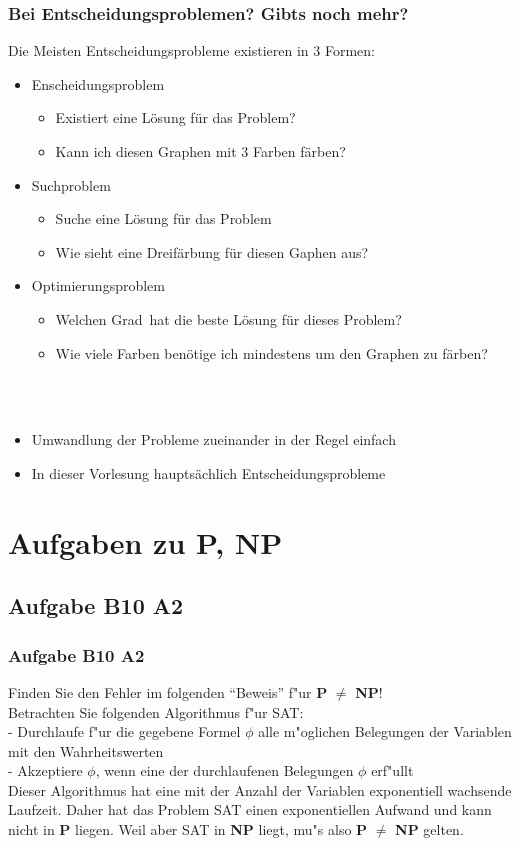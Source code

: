 \begin{frame}
\frametitle{Bei Entscheidungsproblemen? Gibts noch mehr?}

Die Meisten Entscheidungsprobleme existieren in 3 Formen:
\begin{itemize}
	\item Enscheidungsproblem
	\begin{itemize}
		\item Existiert eine Lösung für das Problem?
		\item \glqq Kann ich diesen Graphen mit 3 Farben färben?\grqq
	\end{itemize}
	\item Suchproblem
	\begin{itemize}
		\item Suche eine Lösung für das Problem
		\item \glqq Wie sieht eine Dreifärbung für diesen Gaphen aus?\grqq
	\end{itemize}
	\item Optimierungsproblem
	\begin{itemize}
		\item Welchen \glqq Grad\grqq\ hat die beste Lösung für dieses Problem?
		\item \glqq Wie viele Farben benötige ich mindestens um den Graphen zu färben?\grqq
	\end{itemize}
\end{itemize}~\\~\\
\begin{itemize}
	\item Umwandlung der Probleme zueinander in der Regel einfach
	\item In dieser Vorlesung hauptsächlich Entscheidungsprobleme
\end{itemize}
\end{frame}

\section{Aufgaben zu P, NP}
\subsection{Aufgabe B10 A2}
\begin{frame}
	\frametitle{Aufgabe B10 A2}
	Finden Sie den Fehler im folgenden ``Beweis'' f"ur \textbf{P} $\not=$ \textbf{NP}!\\
	Betrachten Sie folgenden Algorithmus f"ur SAT:\\[4pt]
	- Durchlaufe f"ur die gegebene Formel $\phi$ alle m"oglichen Belegungen der
	Variablen mit den Wahrheitswerten\\
	- Akzeptiere $\phi$, wenn eine der durchlaufenen Belegungen $\phi$ erf"ullt\\[4pt]
	Dieser Algorithmus hat eine mit der Anzahl der Variablen exponentiell wachsende
	Laufzeit. Daher hat das Problem SAT einen exponentiellen Aufwand und kann nicht in
	\textbf{P} liegen. Weil aber SAT in \textbf{NP} liegt, mu"s also \textbf{P} $\not=$
	\textbf{NP} gelten.
\end{frame}
